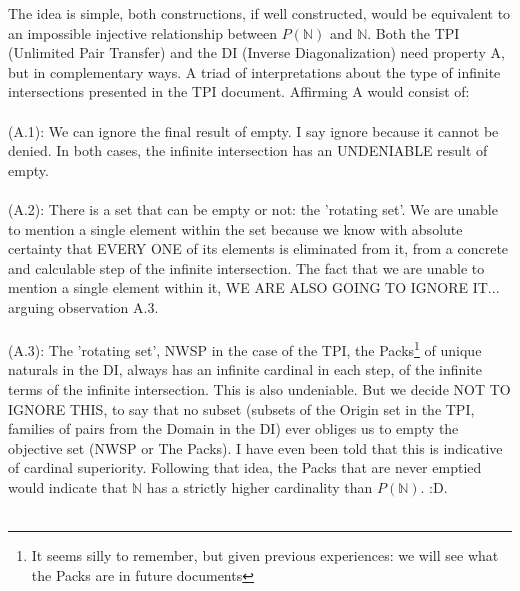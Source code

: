 	\noindent
	The idea is simple, both constructions, if well constructed, would be equivalent to an impossible injective relationship between $P(\mathbb{N})$ and $\mathbb{N}$. Both the TPI (Unlimited Pair Transfer) and the DI (Inverse Diagonalization) need property A, but in complementary ways. A triad of interpretations about the type of infinite intersections presented in the TPI document. Affirming A would consist of:\\\\
	(A.1): We can ignore the final result of empty. I say ignore because it cannot be denied. In both cases, the infinite intersection has an UNDENIABLE result of empty.\\\\
	(A.2): There is a set that can be empty or not: the 'rotating set'. We are unable to mention a single element within the set because we know with absolute certainty that EVERY ONE of its elements is eliminated from it, from a concrete and calculable step of the infinite intersection. The fact that we are unable to mention a single element within it, WE ARE ALSO GOING TO IGNORE IT... arguing observation A.3.\\\\
	(A.3): The 'rotating set', NWSP in the case of the TPI, the Packs\footnote{It seems silly to remember, but given previous experiences: we will see what the Packs are in future documents} of unique naturals in the DI, always has an infinite cardinal in each step, of the infinite terms of the infinite intersection. This is also undeniable. But we decide NOT TO IGNORE THIS, to say that no subset (subsets of the Origin set in the TPI, families of pairs from the Domain in the DI) ever obliges us to empty the objective set (NWSP or The Packs). I have even been told that this is indicative of cardinal superiority. Following that idea, the Packs that are never emptied would indicate that $\mathbb{N}$ has a strictly higher cardinality than $P(\mathbb{N})$. :D.\\\\
	
